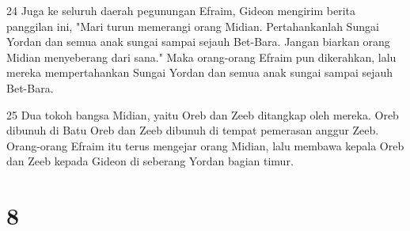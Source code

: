 \par 24 Juga ke seluruh daerah pegunungan Efraim, Gideon mengirim berita panggilan ini, "Mari turun memerangi orang Midian. Pertahankanlah Sungai Yordan dan semua anak sungai sampai sejauh Bet-Bara. Jangan biarkan orang Midian menyeberang dari sana." Maka orang-orang Efraim pun dikerahkan, lalu mereka mempertahankan Sungai Yordan dan semua anak sungai sampai sejauh Bet-Bara.
\par 25 Dua tokoh bangsa Midian, yaitu Oreb dan Zeeb ditangkap oleh mereka. Oreb dibunuh di Batu Oreb dan Zeeb dibunuh di tempat pemerasan anggur Zeeb. Orang-orang Efraim itu terus mengejar orang Midian, lalu membawa kepala Oreb dan Zeeb kepada Gideon di seberang Yordan bagian timur.

\chapter{8}

